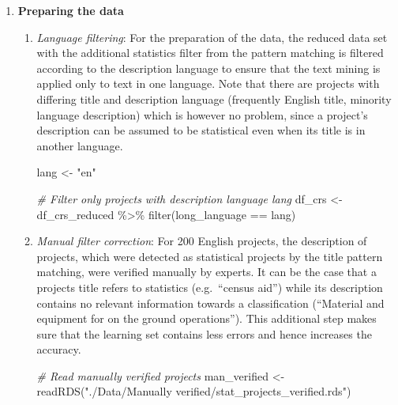 \documentclass[
]{article}
\newenvironment{Shaded}{\begin{snugshade}}{\end{snugshade}}
\newcommand{\CommentTok}[1]{\textcolor[rgb]{0.56,0.35,0.01}{\textit{#1}}}
\newcommand{\FunctionTok}[1]{\textcolor[rgb]{0.00,0.00,0.00}{#1}}
\newcommand{\NormalTok}[1]{#1}
\newcommand{\OtherTok}[1]{\textcolor[rgb]{0.56,0.35,0.01}{#1}}
\newcommand{\SpecialCharTok}[1]{\textcolor[rgb]{0.00,0.00,0.00}{#1}}
\newcommand{\StringTok}[1]{\textcolor[rgb]{0.31,0.60,0.02}{#1}}
\begin{document}
\begin{enumerate}
\def\labelenumi{\arabic{enumi}.}
\item
  \textbf{Preparing the data}

  \begin{enumerate}
  \def\labelenumii{\roman{enumii}.}
  \item
    \emph{Language filtering}: For the preparation of the data, the reduced data set with the additional statistics filter from the pattern matching is filtered according to the description language to ensure that the text mining is applied only to text in one language. Note that there are projects with differing title and description language (frequently English title, minority language description) which is however no problem, since a project's description can be assumed to be statistical even when its title is in another language.

\begin{Shaded}
\begin{Highlighting}[]
\NormalTok{lang }\OtherTok{\textless{}{-}} \StringTok{"en"}

\CommentTok{\# Filter only projects with description language lang}
\NormalTok{df\_crs }\OtherTok{\textless{}{-}}\NormalTok{ df\_crs\_reduced }\SpecialCharTok{\%\textgreater{}\%}
  \FunctionTok{filter}\NormalTok{(long\_language }\SpecialCharTok{==}\NormalTok{ lang)}
\end{Highlighting}
\end{Shaded}
  \item
    \emph{Manual filter correction}: For 200 English projects, the description of projects, which were detected as statistical projects by the title pattern matching, were verified manually by experts. It can be the case that a projects title refers to statistics (e.g.~``census aid'') while its description contains no relevant information towards a classification (``Material and equipment for on the ground operations''). This additional step makes sure that the learning set contains less errors and hence increases the accuracy.

\begin{Shaded}
\begin{Highlighting}[]
\CommentTok{\# Read manually verified projects }
\NormalTok{man\_verified }\OtherTok{\textless{}{-}} \FunctionTok{readRDS}\NormalTok{(}\StringTok{"./Data/Manually verified/stat\_projects\_verified.rds"}\NormalTok{)}


\end{Highlighting}
\end{Shaded}
\end{enumerate}
\end{enumerate}
\end{document}
